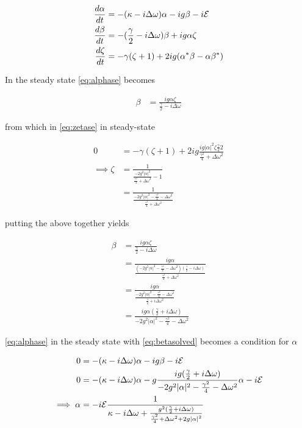 \begin{align}
\frac{d \alpha}{dt} &= -(\kappa - i \Delta \omega)\alpha - ig \beta - i\mathcal{E}\label{eq:alphase}\\
\frac{d \beta}{dt} &= -(\frac{\gamma}{2}-i\Delta\omega)\beta+ig\alpha\zeta \label{eq:betase}\\
\frac{d\zeta}{dt} &= -\gamma (\zeta +1)+2ig(\alpha^*\beta-\alpha\beta^*) \label{eq:zetase}
\end{align}

In the steady state \cref{eq:alphase} becomes

\begin{align}
  \beta &= \frac{ig\alpha\zeta}{\frac{\gamma}{2}-i\Delta\omega}
\end{align}

from which in \cref{eq:zetase} in steady-state

\begin{align}
  0 &= -\gamma(\zeta+1)+2ig\frac{ig|\alpha|^2\zeta\frac{\gamma}{2}2}{\frac{\gamma^2}{4}+\Delta\omega^2} \\
  \implies \zeta &= \frac{1}{\frac{-2g^2|\alpha|^2}{\frac{\gamma^2}{4} +\Delta\omega^2}-1} \\
  &= \frac{1}{\frac{-2g^2|\alpha|^2 - \frac{\gamma^2}{4}-\Delta\omega^2}{\frac{\gamma^2}{4} +\Delta\omega^2}}
\end{align}

putting the above together yields

\begin{align}
  \beta &= \frac{ig\alpha\zeta}{\frac{\gamma}{2}-i\Delta\omega}\\
  &= \frac{ig\alpha}{\frac{(-2g^2|\alpha|^2-\frac{\gamma^2}{4}-\Delta\omega^2)(\frac{\gamma}{2}-i\Delta\omega)}{\frac{\gamma^2}{4}+\Delta\omega^2}}\\
  &= \frac{ig\alpha}{\frac{-2g^2|\alpha|^2-\frac{\gamma^2}{4}-\Delta\omega^2}{\frac{\gamma}{2}+i\Delta\omega^2}}\\
  &= \frac{ig\alpha(\frac{\gamma}{2}+i\Delta\omega)}{-2g^2|\alpha|^2-\frac{\gamma^2}{4}-\Delta\omega^2} \label{eq:betasolved}
\end{align}

\cref{eq:alphase} in the steady state with  \cref{eq:betasolved} becomes a condition for $\alpha$

\begin{align} %
0&=-(\kappa-i\Delta\omega)\alpha-ig\beta-i\Epsilon \\
0&=-{(\kappa-i\Delta\omega)}\alpha-g\frac{ig(\frac{\gamma}{2}+i\Delta\omega)}{-2g^2|\alpha|^2-\frac{\gamma^2}{4}-\Delta\omega^2}\alpha-i\Epsilon \\
\implies \alpha &= -i\Epsilon \frac{1}{\kappa-i\Delta\omega+\frac{g^2(\frac{\gamma}{2}+i\Delta\omega)}{\frac{\gamma^2}{4}+{\Delta\omega}^2+2g{|\alpha|}^2}}\label{eq:alphadetdiss}
\end{align}

